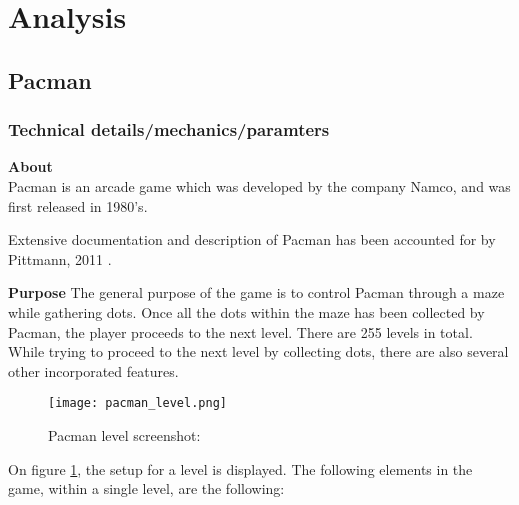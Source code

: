 
\section{Analysis} \label{sec:analysis}




\subsection{Pacman}

\subsubsection{Technical details/mechanics/paramters}

\textbf{About}\\
Pacman is an arcade game which was developed by the company Namco, and was first released in 1980's.

Extensive documentation and description of Pacman has been accounted for by Pittmann, 2011 \cite{Pittman2011}.

\textbf{Purpose}
The general purpose of the game is to control Pacman through a maze while gathering dots. Once all the dots within the maze has been collected by Pacman, the player proceeds to the next level. There are 255 levels in total.\\

While trying to proceed to the next level by collecting dots, there are also several other incorporated features.

\begin{figure}[!htbp]
\centering
\texttt{[image: pacman\_level.png]}
\caption{Pacman level screenshot: \cite{Pittman2011} }
\label{fig:Pacman}
\end{figure}


On figure \ref{fig:Pacman}, the setup for a level is displayed. The following elements in the game, within a single level, are the following:

